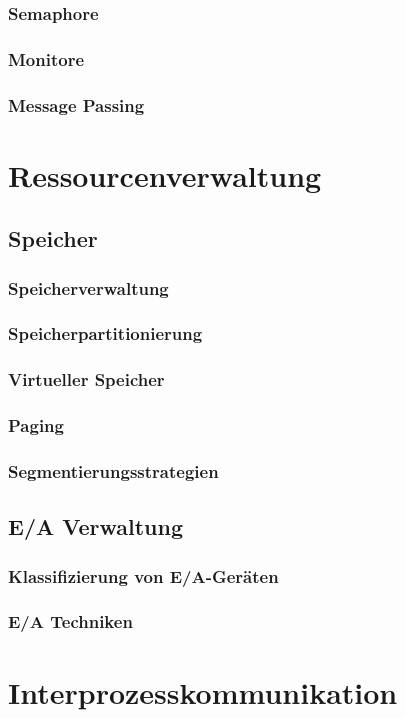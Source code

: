 \documentclass{article}
\begin{document}
\subsubsection{Semaphore}
\subsubsection{Monitore}
\subsubsection{Message Passing}

\newpage
\section{Ressourcenverwaltung}
\subsection{Speicher}
\subsubsection{Speicherverwaltung}
\subsubsection{Speicherpartitionierung}
\subsubsection{Virtueller Speicher}
\subsubsection{Paging}
\subsubsection{Segmentierungsstrategien}
\subsection{E/A Verwaltung}
\subsubsection{Klassifizierung von E/A-Geräten}
\subsubsection{E/A Techniken}

\newpage
\section{Interprozesskommunikation}
\end{document}
